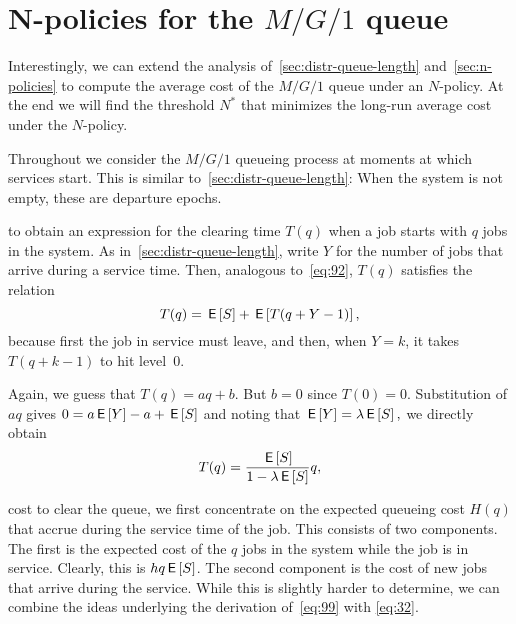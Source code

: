 


\section{N-policies for the $M/G/1$ queue}
\label{sec:n-policies-mg1}

Interestingly, we can extend the analysis of~\cref{sec:distr-queue-length} and~\cref{sec:n-policies} to compute the average cost of the $M/G/1$ queue under an $N$-policy.
At the end we will find the threshold $N^*$ that minimizes the long-run average cost under the $N$-policy.

Throughout we consider the $M/G/1$ queueing process at moments at which services start.
This is similar to~\cref{sec:distr-queue-length}: When the system is not empty, these are departure epochs.


 to obtain an expression for the clearing time $T(q)$ when a job starts with $q$ jobs in the system.
As in~\cref{sec:distr-queue-length}, write $Y$ for the number of jobs that arrive during a service time.
Then, analogous to~\cref{eq:92}, $T(q)$ satisfies the relation
\begin{equation}\label{eq:33}
  T(q) = \,\mathsf{E}\left[S\right] + \,\mathsf{E}\left[T(q+Y-1)\right],
\end{equation}
because first the job in service must leave, and then,  when $Y=k$,  it takes $T(q+k-1)$ to hit level~$0$.

Again, we guess that $T(q) = a q + b$.
But $b=0$ since $T(0)=0$.
Substitution of $a q$ gives $0 =a\,\mathsf{E}\left[Y\right] - a + \,\mathsf{E}\left[S\right]$ and noting that $\,\mathsf{E}\left[Y\right] = \lambda \,\mathsf{E}\left[S\right],$ we directly obtain
\begin{equation*}
  T(q) = \frac{\,\mathsf{E}\left[S\right]}{1-\lambda \,\mathsf{E}\left[S\right]}q,
\end{equation*}

 cost to clear the queue, we first concentrate on the expected queueing cost $H(q)$ that accrue during the service time of the job.
This consists of two components.
The first is the expected cost of the $q$ jobs in the system while the job is in service.
Clearly, this is $h q \,\mathsf{E}\left[S\right]$.
The second component is the cost of new jobs that arrive during the service.
While this is slightly harder to determine, we can combine the ideas underlying the derivation of~\cref{eq:99} with \cref{eq:32}.

